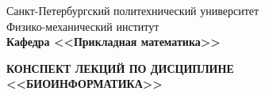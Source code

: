 \documentclass[main.tex]{subfiles}
\begin{document}
	\begin{titlepage}
		\begin{center}
			\begin{large}
				Санкт-Петербургский политехнический университет\\
				Физико-механический институт\\
				\textbf{Кафедра <<Прикладная математика>>}\\
			\end{large}
			\vfill
			\Large{\textbf{КОНСПЕКТ ЛЕКЦИЙ ПО ДИСЦИПЛИНЕ \\
					<<БИОИНФОРМАТИКА>>}}
		\end{center}
		\vfill
		\begin{figure}[H]
		\end{figure}
		\vfill
	\end{titlepage}
\end{document}
